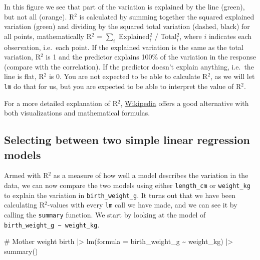 \documentclass[
  letterpaper,
  DIV=11,
  numbers=noendperiod]{scrreprt}
\newenvironment{Shaded}{\begin{snugshade}}{\end{snugshade}}
\newcommand{\AttributeTok}[1]{\textcolor[rgb]{0.40,0.45,0.13}{#1}}
\newcommand{\CommentTok}[1]{\textcolor[rgb]{0.37,0.37,0.37}{#1}}
\newcommand{\FunctionTok}[1]{\textcolor[rgb]{0.28,0.35,0.67}{#1}}
\newcommand{\NormalTok}[1]{\textcolor[rgb]{0.00,0.23,0.31}{#1}}
\newcommand{\SpecialCharTok}[1]{\textcolor[rgb]{0.37,0.37,0.37}{#1}}
\begin{document}
In this figure we see that part of the variation is explained by the
line (green), but not all (orange). R\(^2\) is calculated by summing
together the squared explained variation (green) and dividing by the
squared total variation (dashed, black) for all points, mathematically
R\(^2\) = \(\sum_{i}\) Explained\(_i^2\) / Total\(_i^2\), where \(i\)
indicates each observation, i.e.~each point. If the explained variation
is the same as the total variation, R\(^2\) is 1 and the predictor
explains 100\% of the variation in the response (compare with the
correlation). If the predictor doesn't explain anything, i.e.~the line
is flat, R\(^2\) is 0. You are not expected to be able to calculate
R\(^2\), as we will let \texttt{lm} do that for us, but you are expected
to be able to interpret the value of R\(^2\).

For a more detailed explanation of R\(^2\),
\href{https://en.wikipedia.org/wiki/Coefficient_of_determination}{Wikipedia}
offers a good alternative with both visualizations and mathematical
formulas.

\subsection{Selecting between two simple linear regression
models}\label{selecting-between-two-simple-linear-regression-models}

Armed with R\(^2\) as a measure of how well a model describes the
variation in the data, we can now compare the two models using either
\texttt{length\_cm} or \texttt{weight\_kg} to explain the variation in
\texttt{birth\_weight\_g}. It turns out that we have been calculating
R\(^2\)-values with every \texttt{lm} call we have made, and we can see
it by calling the \texttt{summary} function. We start by looking at the
model of \texttt{birth\_weight\_g\ \textasciitilde{}\ weight\_kg}.

\begin{Shaded}
\begin{Highlighting}[]
\CommentTok{\# Mother weight}
\NormalTok{birth }\SpecialCharTok{|\textgreater{}} 
  \FunctionTok{lm}\NormalTok{(}\AttributeTok{formula =}\NormalTok{ birth\_weight\_g }\SpecialCharTok{\textasciitilde{}}\NormalTok{ weight\_kg) }\SpecialCharTok{|\textgreater{}} 
  \FunctionTok{summary}\NormalTok{()}
\end{Highlighting}
\end{Shaded}
\end{document}
